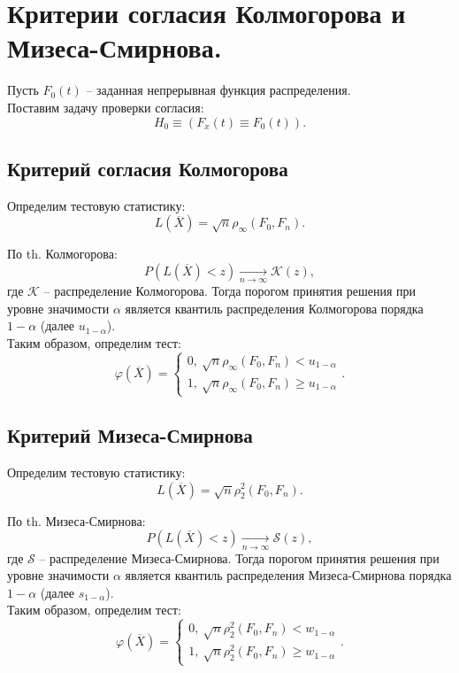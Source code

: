 \section{Критерии согласия Колмогорова и Мизеса-Смирнова.}

Пусть $F_0(t)$ -- заданная непрерывная функция распределения.\\

Поставим задачу проверки согласия:
\[
  H_0 \equiv (F_x(t) \equiv F_0(t))
.\]

\subsection{Критерий согласия Колмогорова}

Определим тестовую статистику:
\[
  L(\overline{X}) = \sqrt{n} \rho_{\infty}(F_0, F_n)
.\]

По th. Колмогорова:
\[
  P(L(\overline{X}) < z) \xrightarrow[n \to \infty]{} \mathcal{K}(z)
,\]
где $\mathcal{K}$ -- распределение Колмогорова.
Тогда порогом принятия решения при уровне значимости $\alpha$ является
квантиль распределения Колмогорова порядка $1 - \alpha$
(далее $u_{1 - \alpha}$).\\

Таким образом, определим тест:
\[
  \varphi(\overline{X}) = \begin{cases}
    0,~ \sqrt{n} \rho_{\infty}(F_0, F_n) < u_{1 - \alpha}\\
    1,~ \sqrt{n} \rho_{\infty}(F_0, F_n) \geqslant u_{1 - \alpha}
  \end{cases}
.\]

\subsection{Критерий Мизеса-Смирнова}

Определим тестовую статистику:
\[
  L(\overline{X}) = \sqrt{n} \rho_{2}^{2}(F_0, F_n)
.\]

По th. Мизеса-Смирнова:
\[
  P(L(\overline{X}) < z) \xrightarrow[n \to \infty]{} \mathcal{S}(z)
,\]
где $\mathcal{S}$ -- распределение Мизеса-Смирнова.
Тогда порогом принятия решения при уровне значимости $\alpha$ является
квантиль распределения Мизеса-Смирнова порядка $1 - \alpha$
(далее $s_{1 - \alpha}$).\\

Таким образом, определим тест:
\[
  \varphi(\overline{X}) = \begin{cases}
    0,~ \sqrt{n} \rho_{2}^{2}(F_0, F_n) < w_{1 - \alpha}\\
    1,~ \sqrt{n} \rho_{2}^{2}(F_0, F_n) \geqslant w_{1 - \alpha}
  \end{cases}
.\]

